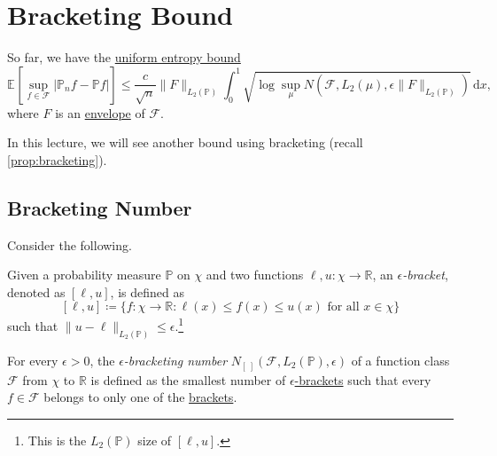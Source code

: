 \section{Bracketing Bound}
\begin{prev}
	So far, we have the \hyperref[thm:uniform-entropy-integral-bound]{uniform entropy bound}
	\[
		\mathbb{E}_{}\left[\sup _{f\in \mathscr{F} } \vert \mathbb{P} _n f - \mathbb{P} f \vert \right]
		\leq \frac{c}{\sqrt{n} } \lVert F \rVert _{L_2(\mathbb{P} )} \int_{0}^{1} \sqrt{\log \sup _\mu N(\mathscr{F} , L_2(\mu ), \epsilon \lVert F \rVert _{L_2(\mathbb{P} )})}  \,\mathrm{d}x,
	\]
	where \(F\) is an \hyperref[def:envelope]{envelope} of \(\mathscr{F} \).
\end{prev}

In this lecture, we will see another bound using bracketing (recall \autoref{prop:bracketing}).

\subsection{Bracketing Number}
Consider the following.

\begin{definition}\label{def:eps-bracket}
	Given a probability measure \(\mathbb{P} \) on \(\chi \) and two functions \(\ell , u\colon \chi \to \mathbb{R} \), an \emph{\(\epsilon \)-bracket}, denoted as \([\ell , u]\), is defined as
	\[
		[\ell , u] \coloneqq \{ f\colon \chi \to \mathbb{R} \colon \ell (x) \leq f(x) \leq u(x) \text{ for all } x\in \chi  \}
	\]
	such that \(\lVert u - \ell \rVert _{L_2(\mathbb{P} )} \leq \epsilon \).\footnote{This is the \(L_2(\mathbb{P} )\) size of \([\ell , u]\).}
\end{definition}

\begin{definition}\label{def:bracketing-number}
	For every \(\epsilon > 0\), the \emph{\(\epsilon \)-bracketing number} \(N_{[\ ]}(\mathscr{F} , L_2(\mathbb{P} ), \epsilon )\) of a function class \(\mathscr{F} \) from \(\chi \) to \(\mathbb{R} \) is defined as the smallest number of \hyperref[def:eps-bracket]{\(\epsilon \)-brackets} such that every \(f\in \mathscr{F} \) belongs to only one of the \hyperref[def:eps-bracket]{brackets}.
\end{definition}


